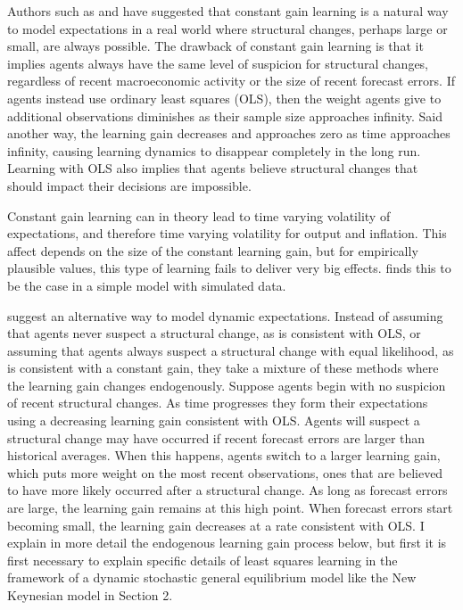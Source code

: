 Authors such as  and  have suggested that constant gain learning is a natural way to model expectations in a real world where structural changes, perhaps large or small, are always possible.  The drawback of constant gain learning is that it implies agents always have the same level of suspicion for structural changes, regardless of recent macroeconomic activity or the size of recent forecast errors.  If agents instead use ordinary least squares (OLS), then the weight agents give to additional observations diminishes as their sample size approaches infinity.  Said another way, the learning gain decreases and approaches zero as time approaches infinity, causing learning dynamics to disappear completely in the long run.  Learning with OLS also implies that agents believe structural changes that should impact their decisions are impossible.

Constant gain learning can in theory lead to time varying volatility of expectations, and therefore time varying volatility for output and inflation.  This affect depends on the size of the constant learning gain, but for empirically plausible values, this type of learning fails to deliver very big effects.    finds this to be the case in a simple model with simulated data. 

 suggest an alternative way to model dynamic expectations.  Instead of assuming that agents never suspect a structural change, as is consistent with OLS, or assuming that agents always suspect a structural change with equal likelihood, as is consistent with a constant gain, they take a mixture of these methods where the learning gain changes endogenously.  Suppose agents begin with no suspicion of recent structural changes.  As time progresses they form their expectations using a decreasing learning gain consistent with OLS.  Agents will suspect a structural change may have occurred if recent forecast errors are larger than historical averages.  When this happens, agents switch to a larger learning gain, which puts more weight on the most recent observations, ones that are believed to have more likely occurred after a structural change.  As long as forecast errors are large, the learning gain remains at this high point.  When forecast errors start becoming small, the learning gain decreases at a rate consistent with OLS.  I explain in more detail the endogenous learning gain process below, but first it is first necessary to explain specific details of least squares learning in the framework of a dynamic stochastic general equilibrium model like the New Keynesian model in Section 2.

